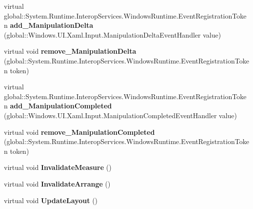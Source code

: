 \begin{DoxyCompactItemize}
\item 
\mbox{\label{class_windows_1_1_u_i_1_1_xaml_1_1_u_i_element_ac039d3e48cf74001e79d9a00893c2fb0}} 
virtual global\+::\+System.\+Runtime.\+Interop\+Services.\+Windows\+Runtime.\+Event\+Registration\+Token {\bfseries add\+\_\+\+Manipulation\+Delta} (global\+::\+Windows.\+U\+I.\+Xaml.\+Input.\+Manipulation\+Delta\+Event\+Handler value)
\item 
\mbox{\label{class_windows_1_1_u_i_1_1_xaml_1_1_u_i_element_aba1edd03abe3a079446b00630ed5e5ce}} 
virtual void {\bfseries remove\+\_\+\+Manipulation\+Delta} (global\+::\+System.\+Runtime.\+Interop\+Services.\+Windows\+Runtime.\+Event\+Registration\+Token token)
\item 
\mbox{\label{class_windows_1_1_u_i_1_1_xaml_1_1_u_i_element_a977eb5bb8e170069cf88e863a41c5bb5}} 
virtual global\+::\+System.\+Runtime.\+Interop\+Services.\+Windows\+Runtime.\+Event\+Registration\+Token {\bfseries add\+\_\+\+Manipulation\+Completed} (global\+::\+Windows.\+U\+I.\+Xaml.\+Input.\+Manipulation\+Completed\+Event\+Handler value)
\item 
\mbox{\label{class_windows_1_1_u_i_1_1_xaml_1_1_u_i_element_a7c48548622512fe1236390a569a15e25}} 
virtual void {\bfseries remove\+\_\+\+Manipulation\+Completed} (global\+::\+System.\+Runtime.\+Interop\+Services.\+Windows\+Runtime.\+Event\+Registration\+Token token)
\item 
\mbox{\label{class_windows_1_1_u_i_1_1_xaml_1_1_u_i_element_af682a477dc1f76b91d264ebf62e93325}} 
virtual void {\bfseries Invalidate\+Measure} ()
\item 
\mbox{\label{class_windows_1_1_u_i_1_1_xaml_1_1_u_i_element_a7d39da17eef05f2abf010551fe537ef7}} 
virtual void {\bfseries Invalidate\+Arrange} ()
\item 
\mbox{\label{class_windows_1_1_u_i_1_1_xaml_1_1_u_i_element_a6b5438d6f477c2ec1851d0ab5cc2d36c}} 
virtual void {\bfseries Update\+Layout} ()

\end{DoxyCompactItemize}
